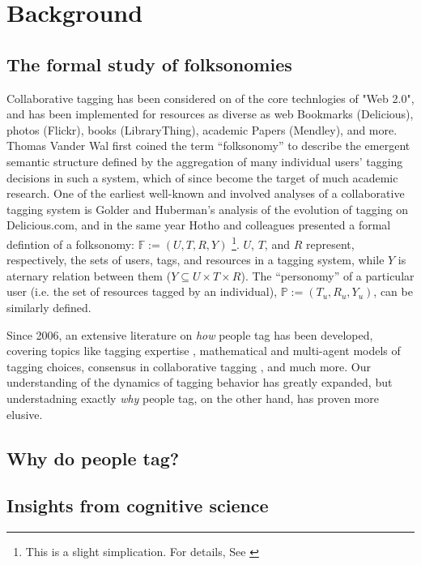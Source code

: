 \section{Background}
\label{sec_related}

\subsection{The formal study of folksonomies}
Collaborative tagging has been considered on of the core technlogies of "Web 2.0", and has been implemented for resources as diverse as web Bookmarks (Delicious), photos (Flickr), books (LibraryThing), academic Papers (Mendley), and more. Thomas Vander Wal \cite{VanderWal2007} first coined the term ``folksonomy'' to describe the emergent semantic structure defined by the aggregation of many individual users' tagging decisions in such a system, which of since become the target of much academic research. One of the earliest well-known and involved analyses of a collaborative tagging system is Golder and Huberman's \cite{Golder2006} analysis of the evolution of tagging on Delicious.com, and in the same year Hotho and colleagues \cite{Hotho2006a} presented a formal defintion of a folksonomy: $\mathbb{F} := (U,T,R,Y)$ \footnote{This is a slight simplication. For details, See \cite{Hotho2006a}}. $U$, $T$, and $R$ represent, respectively, the sets of users, tags, and resources in a tagging system, while $Y$ is  aternary relation between them ($Y \subseteq U \times T \times R$). The ``personomy'' of a particular user (i.e. the set of resources tagged by an individual),  $\mathbb{P} := (T_{u},R_{u},Y_{u})$, can be similarly defined.

Since 2006, an extensive literature on \emph{how} people tag has been developed, covering topics like tagging expertise \cite{Yeung2009,Yeung2011},	mathematical \cite{Cattuto2007} and multi-agent \cite{Lorince2013} models of tagging choices, consensus in collaborative tagging \cite{Robu2009}, and much more. Our understanding of the dynamics of tagging behavior has greatly expanded, but understadning exactly \emph{why} people tag, on the other hand, has proven more elusive.

\subsection{Why do people tag?}

\subsection{Insights from cognitive science}